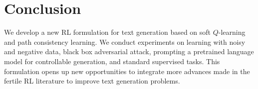 
\section{Conclusion}
We develop a new RL formulation for text generation based on soft $Q$-learning and path consistency learning.
We conduct experiments on learning with noisy and negative data, black box adversarial attack, prompting a pretrained language model for controllable generation, and  standard supervised tasks. This formulation opens up new opportunities to integrate more advances made in the fertile RL literature to improve text
generation problems. 

